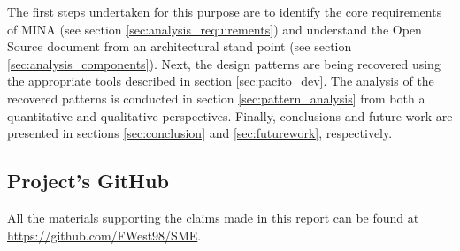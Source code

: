 The first steps undertaken for this purpose are to identify the core requirements of MINA (see section \ref{sec:analysis_requirements}) and understand the Open Source document from an architectural stand point (see section \ref{sec:analysis_components}). Next, the design patterns are being recovered using the appropriate tools described in section \ref{sec:pacito_dev}. The analysis of the recovered patterns is conducted in section \ref{sec:pattern_analysis} from both a quantitative and qualitative perspectives. Finally, conclusions and future work are presented in sections \ref{sec:conclusion} and \ref{sec:futurework}, respectively.

\subsection{Project's GitHub}
All the materials supporting the claims made in this report can be found at \url{https://github.com/FWest98/SME}.
